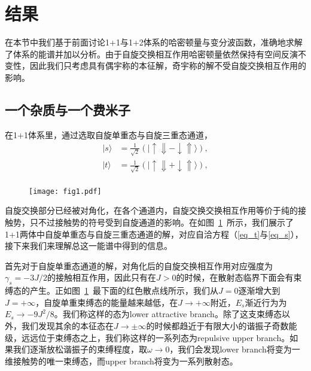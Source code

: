\section{结果}\label{sec:spex-result}
在本节中我们基于前面讨论1+1与1+2体系的哈密顿量与变分波函数，准确地求解了体系的能谱并加以分析。由于自旋交换相互作用哈密顿量依然保持有空间反演不变性，因此我们只考虑具有偶宇称的本征解，奇宇称的解不受自旋交换相互作用的影响。

\subsection{一个杂质与一个费米子}
在1+1体系里，通过选取自旋单重态与自旋三重态通道，
\begin{equation}
\begin{split}
    |s\rangle &= \frac{1}{\sqrt{2}}(|\uparrow\Downarrow - \downarrow\Uparrow\rangle),\\
    |t\rangle &= \frac{1}{\sqrt{2}}(|\uparrow\Downarrow + \downarrow\Uparrow\rangle),\\
\end{split}
\end{equation}

\begin{figure}[!htbp]
    \centering
    \texttt{[image: fig1.pdf]}
    \label{fig:fig1}
\end{figure}

自旋交换部分已经被对角化，在各个通道内，自旋交换交换相互作用等价于纯的接触势，只不过接触势的符号受到自旋通道的影响。在如图~\ref{fig:fig1}~所示，我们展示了1+1两体中自旋单重态与自旋三重态通道的解，对应自洽方程（\ref{eq_t}与\ref{eq_s}），接下来我们来理解总这一能谱中得到的信息。



首先对于自旋单重态通道的解，对角化后的自旋交换相互作用对应强度为$\gamma_s=-3J/2$的接触相互作用，因此只有在$J>0$的时候，在散射态临界下面会有束缚态的产生。正如图~\ref{fig:fig1}~最下面的红色散点线所示，我们从$J=0$逐渐增大到$J=+\infty$，自旋单重束缚态的能量越来越低，在$J\to + \infty$附近，$E_s$渐近行为为$E_s\rightarrow -9J^2/8$。我们称这样的态为lower attractive branch。除了这支束缚态以外，我们发现其余的本征态在$J\to \pm \infty$的时候都趋近于有限大小的谐振子奇数能级，远远位于束缚态之上，我们称这样的一系列态为repulsive upper branch。如果我们逐渐放松谐振子的束缚程度，取$\omega\to 0$，我们会发现lower branch将变为一维接触势的唯一束缚态，而upper branch将变为一系列散射态。

